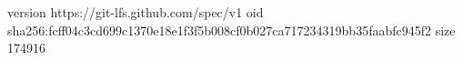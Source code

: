 version https://git-lfs.github.com/spec/v1
oid sha256:fcff04c3cd699c1370e18e1f3f5b008cf0b027ca717234319bb35faabfc945f2
size 174916
